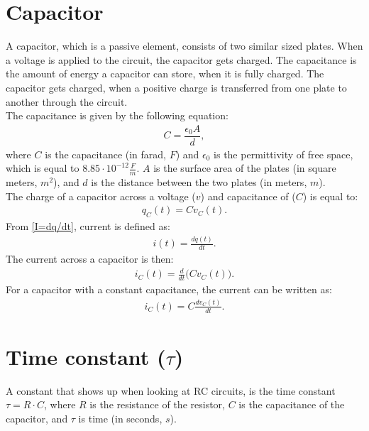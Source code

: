 \section{Capacitor}
A capacitor, which is a passive element, consists of two similar sized plates. When a voltage is applied to the circuit, the capacitor gets charged. The capacitance is the amount of energy a capacitor can store, when it is fully charged. The capacitor gets charged, when a positive charge is transferred from one plate to another through the circuit.
\\
The capacitance is given by the following equation:
\begin{align*}
C=\dfrac{\epsilon_{0}A}{d},
\end{align*}
where $C$ is the capacitance (in farad, $F$) and $\epsilon_{0}$ is the permittivity of free space, which is equal to $8.85 \cdot 10^{-12}                                                 \frac{F}{m}$. $A$ is the surface area of the plates (in square meters, $m^{2}$), and $d$ is the distance between the two plates (in meters, $m$).
\\
The charge of a capacitor across a voltage ($v$) and capacitance of ($C$) is equal to: \cite[p.~253]{bcircuit5}
\begin{align}
\label{QCV}
q_C(t) = Cv_C(t).	
\end{align}
From \eqref{I=dq/dt}, current is defined as:
\begin{align*}
	i(t) = \frac{dq(t)}{dt}.
\end{align*}
The current across a capacitor is then:
\begin{align*}
	i_C(t) = \frac{d}{dt}\big(Cv_C(t)\big).
\end{align*}
For a capacitor with a constant capacitance, the current can be written as:
\begin{align}
	i_C(t) = C\frac{dv_C(t)}{dt}.\label{iC}
\end{align}


\section{Time constant ($\tau$)}
A constant that shows up when looking at RC circuits, is the time constant $\tau = R \cdot C$, where $R$ is the resistance of the resistor, $C$ is the capacitance of the capacitor, and $\tau$ is time (in seconds, $s$).

